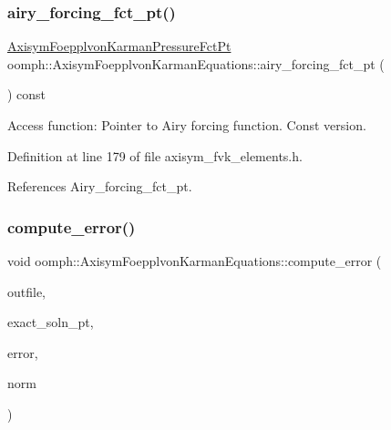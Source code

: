 \subsubsection{\texorpdfstring{airy\+\_\+forcing\+\_\+fct\+\_\+pt()}{airy\_forcing\_fct\_pt()}\hspace{0.1cm}{\footnotesize\ttfamily [2/2]}}
{\footnotesize\ttfamily \hyperlink{classoomph_1_1AxisymFoepplvonKarmanEquations_a504878b18d793ef8a6540eb0f2b086c8}{Axisym\+Foepplvon\+Karman\+Pressure\+Fct\+Pt} oomph\+::\+Axisym\+Foepplvon\+Karman\+Equations\+::airy\+\_\+forcing\+\_\+fct\+\_\+pt (\begin{DoxyParamCaption}{ }\end{DoxyParamCaption}) const\hspace{0.3cm}{\ttfamily [inline]}}



Access function\+: Pointer to Airy forcing function. Const version. 



Definition at line 179 of file axisym\+\_\+fvk\+\_\+elements.\+h.



References Airy\+\_\+forcing\+\_\+fct\+\_\+pt.

\mbox{\label{classoomph_1_1AxisymFoepplvonKarmanEquations_abbcf5312db19fdbe66f5dab3bbe9bfda}} 
\subsubsection{\texorpdfstring{compute\+\_\+error()}{compute\_error()}\hspace{0.1cm}{\footnotesize\ttfamily [1/4]}}
{\footnotesize\ttfamily void oomph\+::\+Axisym\+Foepplvon\+Karman\+Equations\+::compute\+\_\+error (\begin{DoxyParamCaption}\item[{std\+::ostream \&}]{outfile,  }\item[{\hyperlink{classoomph_1_1FiniteElement_a690fd33af26cc3e84f39bba6d5a85202}{Finite\+Element\+::\+Steady\+Exact\+Solution\+Fct\+Pt}}]{exact\+\_\+soln\+\_\+pt,  }\item[{double \&}]{error,  }\item[{double \&}]{norm }\end{DoxyParamCaption})\hspace{0.3cm}{\ttfamily [virtual]}}



